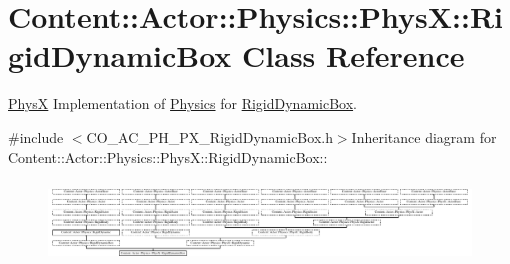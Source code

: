 \hypertarget{classContent_1_1Actor_1_1Physics_1_1PhysX_1_1RigidDynamicBox}{
\section{Content::Actor::Physics::PhysX::RigidDynamicBox Class Reference}
\label{classContent_1_1Actor_1_1Physics_1_1PhysX_1_1RigidDynamicBox}
}


\hyperlink{namespaceContent_1_1Actor_1_1Physics_1_1PhysX}{PhysX} Implementation of \hyperlink{namespaceContent_1_1Actor_1_1Physics}{Physics} for \hyperlink{classContent_1_1Actor_1_1Physics_1_1PhysX_1_1RigidDynamicBox}{RigidDynamicBox}.  


{\ttfamily \#include $<$CO\_\-AC\_\-PH\_\-PX\_\-RigidDynamicBox.h$>$}Inheritance diagram for Content::Actor::Physics::PhysX::RigidDynamicBox::\begin{figure}[H]
\begin{center}
\leavevmode
\includegraphics[height=2.19978cm]{classContent_1_1Actor_1_1Physics_1_1PhysX_1_1RigidDynamicBox}
\end{center}
\end{figure}

